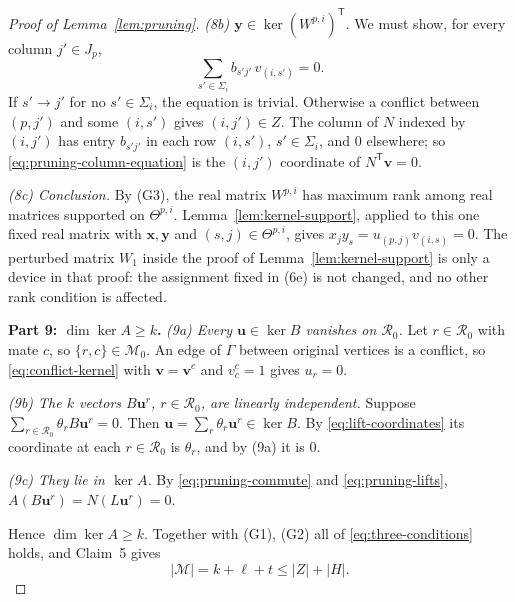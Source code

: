 \documentclass[11pt]{article}
\theoremstyle{remark}
\newcommand{\abs}[1]{\lvert #1\rvert}
\newcommand{\Step}[1]{\par\medskip\noindent\textbf{#1}\enspace}
\newcommand{\tp}{^{\mathsf T}}
\newcommand{\cR}{\mathcal R}
\newcommand{\cM}{\mathcal M}
\newcommand{\bu}{\mathbf u}
\newcommand{\bv}{\mathbf v}
\newcommand{\bx}{\mathbf x}
\newcommand{\by}{\mathbf y}
\begin{document}
\begin{proof}[Proof of Lemma~\ref{lem:pruning}]
\smallskip\noindent\emph{(8b) $\by\in\ker(W^{p,i})\tp$.}
We must show, for every column $j'\in J_p$,
\begin{equation}\label{eq:pruning-column-equation}
 \sum_{s'\in \Sigma_i}b_{s'j'}\,v_{(i,s')}=0.
\end{equation}
If $s'\to j'$ for no $s'\in\Sigma_i$, the equation is trivial. Otherwise a
conflict between $(p,j')$ and some $(i,s')$ gives $(i,j')\in Z$. The column
of $N$ indexed by $(i,j')$ has entry $b_{s'j'}$ in each row $(i,s')$,
$s'\in\Sigma_i$, and $0$ elsewhere; so \eqref{eq:pruning-column-equation} is
the $(i,j')$ coordinate of $N\tp\bv=0$.

\smallskip\noindent\emph{(8c) Conclusion.}
By (G3), the real matrix $W^{p,i}$ has maximum rank among real matrices
supported on $\Theta^{p,i}$. Lemma~\ref{lem:kernel-support}, applied to this
one fixed real matrix with $\bx,\by$ and $(s,j)\in\Theta^{p,i}$, gives
$x_jy_s=u_{(p,j)}v_{(i,s)}=0$. The perturbed matrix $W_1$ inside the proof
of Lemma~\ref{lem:kernel-support} is only a device in that proof: the
assignment fixed in (6e) is not changed, and no other rank condition is
affected.

\Step{Part 9: $\dim\ker A\ge k$.}
\emph{(9a) Every $\bu\in\ker B$ vanishes on $\cR_0$.}
Let $r\in\cR_0$ with mate $c$, so $\{r,c\}\in\cM_0$. An edge of $\Gamma$
between original vertices is a conflict, so \eqref{eq:conflict-kernel} with
$\bv=\bv^c$ and $v^c_c=1$ gives $u_r=0$.

\smallskip\noindent\emph{(9b) The $k$ vectors $B\bu^r$, $r\in\cR_0$, are
linearly independent.} Suppose $\sum_{r\in\cR_0}\theta_rB\bu^r=0$. Then
$\bu=\sum_{r}\theta_r\bu^r\in\ker B$. By \eqref{eq:lift-coordinates} its
coordinate at each $r\in\cR_0$ is $\theta_r$, and by (9a) it is $0$.

\smallskip\noindent\emph{(9c) They lie in $\ker A$.}
By \eqref{eq:pruning-commute} and \eqref{eq:pruning-lifts},
$A(B\bu^r)=N(L\bu^r)=0$.

Hence $\dim\ker A\ge k$. Together with (G1), (G2) all of
\eqref{eq:three-conditions} holds, and Claim~5 gives
\begin{equation}\label{eq:matching-bound}
 \abs{\cM}=k+\ell+t\le\abs Z+\abs H .
\end{equation}


\end{proof}
\end{document}
